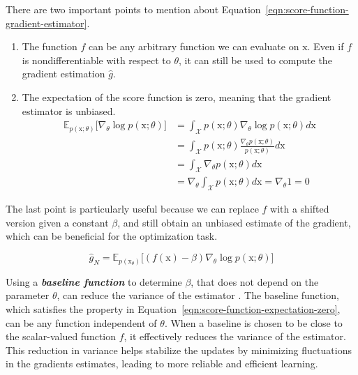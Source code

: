 
\noindent There are two important points to mention about Equation~\ref{eqn:score-function-gradient-estimator}.

\begin{enumerate}
    \item The function $f$ can be any arbitrary function we can evaluate on $\mathrm{x}$. Even if $f$ is nondifferentiable with respect to $\theta$, it can still be used to compute the gradient estimation $\hat{g}$.
    \item The expectation of the score function is zero, meaning that the gradient estimator is unbiased.
    \begin{equation}\label{eqn:score-function-expectation-zero}
    \begin{split}
        \mathbb{E}_{p(\mathrm{x};\theta)}\big[\nabla_{\theta}\log p(\mathrm{x};\theta)\big] 
        &= \int_{\mathcal{X}}p(\mathrm{x};\theta)\nabla_{\theta}\log p(\mathrm{x}; \theta) d\mathrm{x} \\
        &= \int_{\mathcal{X}} p(\mathrm{x};\theta)\frac{\nabla_{\theta} p(\mathrm{x}; \theta)}{p(\mathrm{x};\theta)}d\mathrm{x} \\
        &= \int_{\mathcal{X}}\nabla_{\theta}p(\mathrm{x};\theta)d\mathrm{x} \\
        &= \nabla_{\theta}\int_{\mathcal{X}} p(\mathrm{x}; \theta)d\mathrm{x} = \nabla_{\theta} 1 =0
    \end{split}
    \end{equation}
\end{enumerate}

\noindent The last point is particularly useful because we can replace $f$ with a shifted version given a constant $\beta$, and still obtain an unbiased estimate of the gradient, which can be beneficial for the optimization task.

\begin{equation}\label{eqn:score-function-gradient-estimator-baseline}
\hat{g}_{N} = \mathbb{E}_{p(\mathrm{x}_{\theta})}\big[(f(\mathrm{x}) - \beta) \nabla_{\theta} \log p(\mathrm{x}; \theta)\big]
\end{equation}

\noindent Using a \textbf{\textit{baseline function}} to determine $\beta$, that does not depend on the parameter $\theta$, can reduce the variance of the 
estimator \citep{mohamed2020monte}. The baseline function, which satisfies the property in Equation~\ref{eqn:score-function-expectation-zero}, can be any function independent of
$\theta$. When a baseline is chosen to be close to the scalar-valued function $f$, it effectively reduces the variance of the estimator. This reduction in variance helps stabilize the updates by minimizing fluctuations in the gradients estimates, leading to more reliable and efficient learning.

